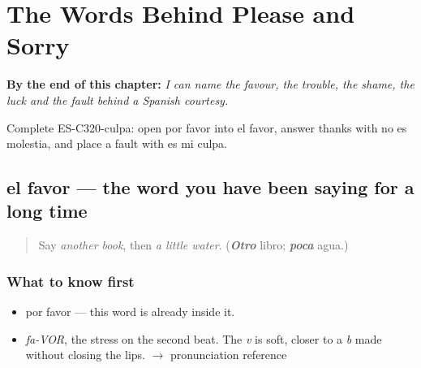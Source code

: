 
\chapter{The Words Behind Please and Sorry}
\label{ch:favor-y-culpa}

\begin{chapteropening}
\textbf{By the end of this chapter:} \emph{I can name the favour, the trouble, the shame, the luck and the fault behind a Spanish courtesy.}

Complete ES-C320-culpa: open por favor into el favor, answer thanks with no es molestia, and place a fault with es mi culpa.
\end{chapteropening}

\section[el favor]{el favor — the word you have been saying for a long time}

\label{lesson:ES-C320-favor}



\begin{quote}
Say \emph{another book}, then \emph{a little water}. (\emph{\textbf{Otro}} libro; \emph{\textbf{poca}} agua.)
\end{quote}

\subsection*{What to know first}
\begin{itemize}
\raggedright
  \item por favor — this word is already inside it.
\end{itemize}

\begin{sounds}
\begin{itemize}
\raggedright
  \item \emph{fa-VOR}, the stress on the second beat. The \emph{v} is soft, closer to a \emph{b} made without closing the lips. $\to$ pronunciation reference
\end{itemize}
\end{sounds}


